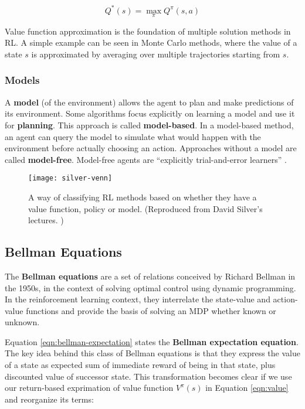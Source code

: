 \begin{equation} \label{eqn:opt-Q-fun}
    Q^*(s) = \max_{\pi}{Q^{\pi}(s, a)}
\end{equation}

Value function approximation is the foundation of multiple solution methods in RL.
A simple example can be seen in Monte Carlo methods, where the value of a state \(s\) is approximated by averaging over multiple trajectories starting from \(s\).

\subsubsection{Models} \label{rl:model}
A \textbf{model} (of the environment) allows the agent to plan and make predictions of its environment.
Some algorithms focus explicitly on learning a model and use it for \textbf{planning}.
This approach is called \textbf{model-based}.
In a model-based method, an agent can query the model to simulate what would happen with the environment before actually choosing an action.
Approaches without a model are called \textbf{model-free}. Model-free agents are ``explicitly trial-and-error learners'' \cite{rlai}.

\begin{figure}[ht]
    \caption{A way of classifying RL methods based on whether they have a value function, policy or model. (Reproduced from David Silver's lectures. \cite{silver-lectures})}
    \vspace*{0.2cm}
    \centering
    \texttt{[image: silver-venn]}
\end{figure}

\subsection{Bellman Equations} \label{rl:bellman}
The \textbf{Bellman equations} are a set of relations conceived by Richard Bellman in the 1950s, in the context of solving optimal control using dynamic programming.
In the reinforcement learning context, they interrelate the state-value and action-value functions and provide the basis of solving an MDP whether known or unknown.

Equation \ref{eqn:bellman-expectation} states the \textbf{Bellman expectation equation}.
The key idea behind this class of Bellman equations is that they express the value of a state as expected sum of immediate reward of being in that state,  plus discounted value of successor state.
This transformation becomes clear if we use our return-based exprimation of value function $V^{\pi}(s)$ in Equation \ref{eqn:value} and reorganize its terms:

